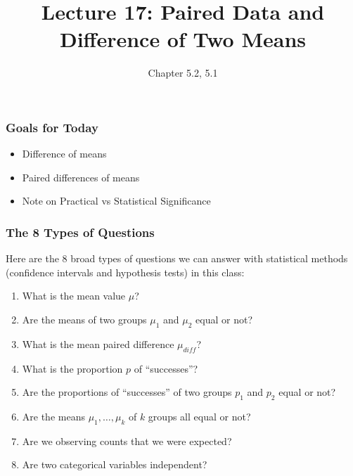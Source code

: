 \documentclass[slides]{beamer}
\title{Lecture 17: Paired Data and Difference of Two Means}
\author{Chapter 5.2, 5.1}
\date{}
\newcommand{\blue}[1]{\textcolor{blue2}{#1}}
\begin{document}
\begin{frame}
\titlepage
\end{frame}


\begin{frame}[fragile]
\frametitle{Goals for Today}

\begin{itemize}
\item Difference of means
\item Paired differences of means
\item Note on Practical vs Statistical Significance
\end{itemize}

\end{frame}


\begin{frame}
\frametitle{The 8 Types of Questions}

Here are the 8 broad types of questions we can answer with statistical methods (confidence intervals and hypothesis tests) in this class: 

\vspace{0.25cm}

\begin{enumerate}
\pause\item What is the mean value $\mu$?
\pause\item Are the means of two groups $\mu_1$ and $\mu_2$ equal or not?
\pause\item What is the mean paired difference $\mu_{diff}$?
\pause\item What is the proportion $p$ of ``successes''?
\pause\item Are the proportions of ``successes'' of two groups $p_1$ and $p_2$ equal or not?
\pause\item Are the means $\mu_1, \ldots, \mu_k$ of $k$ groups \blue{all} equal or not?
\pause\item Are we observing counts that we were expected?
\pause\item Are two categorical variables independent?
\end{enumerate}

\end{frame}
\end{document}
